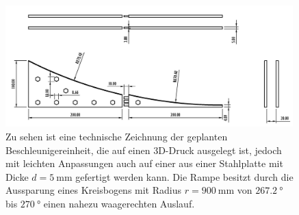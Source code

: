 \begin{figure}[htbp]
\vspace*{0.2cm}
\centering
 \includegraphics[width=0.99\textwidth]{images/rampedraw2.jpg}
  \caption[Technische Zeichnung der Beschleunigereinheit]{Zu sehen ist eine technische Zeichnung der geplanten Beschleunigereinheit, die auf einen 3D-Druck ausgelegt ist, jedoch mit leichten Anpassungen auch auf einer  aus einer Stahlplatte mit Dicke $d=\SI{5}{\milli\metre}$ gefertigt werden kann. Die Rampe besitzt durch  die Aussparung eines Kreisbogens mit Radius $r=\SI{900}{\milli\metre}$ von $\SI{267.2}{\degree}$ bis $\SI{270}{\degree}$ einen nahezu waagerechten Auslauf.}
  \label{fig:rampedraw}
  \vspace{-0pt}
\end{figure}